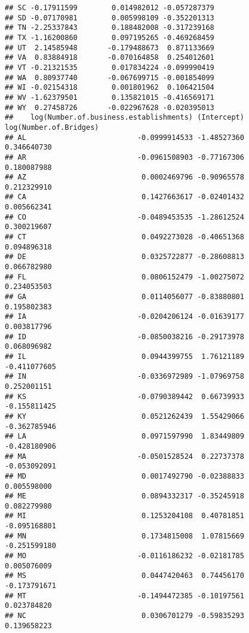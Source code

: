 \documentclass[
]{article}
\begin{document}
\begin{verbatim}
## SC -0.17911599        0.014982012 -0.057287379
## SD -0.07170981        0.005998109 -0.352201313
## TN -2.25337843        0.188482008 -0.317239168
## TX -1.16200860        0.097195265 -0.469268459
## UT  2.14585948       -0.179488673  0.871133669
## VA  0.83884918       -0.070164858  0.254012601
## VT -0.21321535        0.017834224 -0.099990419
## WA  0.80937740       -0.067699715 -0.001854099
## WI -0.02154318        0.001801962  0.106421504
## WV -1.62379501        0.135821015 -0.416569171
## WY  0.27458726       -0.022967628 -0.020395013
##    log(Number.of.business.establishments) (Intercept) log(Number.of.Bridges)
## AL                          -0.0999914533 -1.48527360            0.346640730
## AR                          -0.0961508903 -0.77167306            0.180087988
## AZ                           0.0002469796 -0.90965578            0.212329910
## CA                           0.1427663617 -0.02401432            0.005662341
## CO                          -0.0489453535 -1.28612524            0.300219607
## CT                           0.0492273028 -0.40651368            0.094896318
## DE                           0.0325722877 -0.28608813            0.066782980
## FL                           0.0806152479 -1.00275072            0.234053503
## GA                           0.0114056077 -0.83880801            0.195802383
## IA                          -0.0204206124 -0.01639177            0.003817796
## ID                          -0.0850038216 -0.29173978            0.068096982
## IL                           0.0944399755  1.76121189           -0.411077605
## IN                          -0.0336972989 -1.07969758            0.252001151
## KS                          -0.0790389442  0.66739933           -0.155811425
## KY                           0.0521262439  1.55429066           -0.362785946
## LA                           0.0971597990  1.83449809           -0.428180906
## MA                          -0.0501528524  0.22737378           -0.053092091
## MD                           0.0017492790 -0.02388833            0.005598000
## ME                           0.0894332317 -0.35245918            0.082279980
## MI                           0.1253204108  0.40781851           -0.095168801
## MN                           0.1734815008  1.07815669           -0.251599180
## MO                          -0.0116186232 -0.02181785            0.005076009
## MS                           0.0447420463  0.74456170           -0.173791671
## MT                          -0.1494472385 -0.10197561            0.023784820
## NC                           0.0306701279 -0.59835293            0.139658223

\end{verbatim}
\end{document}

